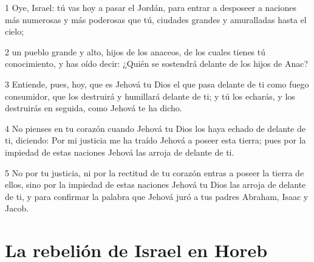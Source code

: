 \par 1 Oye, Israel: tú vas hoy a pasar el Jordán, para entrar a desposeer a naciones más numerosas y más poderosas que tú, ciudades grandes y amuralladas hasta el cielo;
\par 2 un pueblo grande y alto, hijos de los anaceos, de los cuales tienes tú conocimiento, y has oído decir: ¿Quién se sostendrá delante de los hijos de Anac?
\par 3 Entiende, pues, hoy, que es Jehová tu Dios el que pasa delante de ti como fuego consumidor, que los destruirá y humillará delante de ti; y tú los echarás, y los destruirás en seguida, como Jehová te ha dicho.
\par 4 No pienses en tu corazón cuando Jehová tu Dios los haya echado de delante de ti, diciendo: Por mi justicia me ha traído Jehová a poseer esta tierra; pues por la impiedad de estas naciones Jehová las arroja de delante de ti.
\par 5 No por tu justicia, ni por la rectitud de tu corazón entras a poseer la tierra de ellos, sino por la impiedad de estas naciones Jehová tu Dios las arroja de delante de ti, y para confirmar la palabra que Jehová juró a tus padres Abraham, Isaac y Jacob.

\section{La rebelión de Israel en Horeb }

